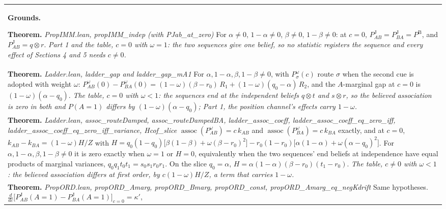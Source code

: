 \documentclass[10pt]{article}
\theoremstyle{definition}
\newcommand{\PB}{P^{\mathrm{B}}}
\newcommand{\PJ}{P^{\mathrm{J}}}
\newcommand{\assoc}{\operatorname{assoc}}
\newlength{\fullw}\setlength{\fullw}{25.9cm}
\begin{document}
{\begin{longtable}{|p{0.9cm}|p{12.2cm}|p{12.2cm}|}
\multicolumn{3}{|p{\fullw}|}{\textbf{Grounds.}\par \textbf{Theorem.} \textit{PropIMM.lean, propIMM\_indep (with PJab\_at\_zero)} \newline For $\alpha\neq0$, $1-\alpha\neq0$, $\beta\neq0$, $1-\beta\neq0$: at $c=0$,
$\PJ_{AB}=\PJ_{BA}=\PB$, and $\PJ_{AB}=q\otimes r$. \newline \textit{Part 1 and the table, $c=0$ with $\omega=1$: the two sequences give one belief, so no statistic registers the sequence and every effect of Sections 4 and 5 needs $c\neq0$.}} \\
\multicolumn{3}{|p{\fullw}|}{\textbf{Theorem.} \textit{Ladder.lean, ladder\_gap and ladder\_gap\_mA1} \newline For $\alpha,1-\alpha,\beta,1-\beta\neq0$, with $P^{\omega}_{\sigma}(c)$ route $\sigma$ when the
second cue is adopted with weight $\omega$:
$P^{\omega}_{AB}(0)-P^{\omega}_{BA}(0)=(1-\omega)(\beta-r_0)\,R_1+(1-\omega)(q_0-\alpha)\,R_2$, and
the $A$-marginal gap at $c=0$ is $(1-\omega)(\alpha-q_0)$. \newline \textit{The table, $c=0$ with $\omega<1$: the sequences end at the independent beliefs $q\otimes t$ and $s\otimes r$, so the believed association is zero in both and $P(A{=}1)$ differs by $(1-\omega)(\alpha-q_0)$; Part 1, the position channel's effects carry $1-\omega$.}} \\
\multicolumn{3}{|p{\fullw}|}{\textbf{Theorem.} \textit{Ladder.lean, assoc\_routeDamped, assoc\_routeDampedBA, ladder\_assoc\_coeff, ladder\_assoc\_coeff\_eq\_zero\_iff, ladder\_assoc\_coeff\_eq\_zero\_iff\_variance, Hcof\_slice} \newline $\assoc(P^{\omega}_{AB})=c\,k_{AB}$ and $\assoc(P^{\omega}_{BA})=c\,k_{BA}$ exactly, and at
$c=0$, $k_{AB}-k_{BA}=(1-\omega)H/Z$ with
$H=q_0(1-q_0)\bigl[\beta(1-\beta)+\omega(\beta-r_0)^2\bigr]-r_0(1-r_0)\bigl[\alpha(1-\alpha)+\omega(\alpha-q_0)^2\bigr]$.
For $\alpha,1-\alpha,\beta,1-\beta\neq0$ it is zero exactly when $\omega=1$ or $H=0$,
equivalently when the two sequences' end beliefs at independence have equal products of
marginal variances, $q_0q_1t_0t_1=s_0s_1r_0r_1$. On the slice $q_0=\alpha$,
$H=\alpha(1-\alpha)(\beta-r_0)(t_1-r_0)$. \newline \textit{The table, $c\neq0$ with $\omega<1$: the believed association differs at first order, by $c(1-\omega)H/Z$, a term that carries $1-\omega$.}} \\
\multicolumn{3}{|p{\fullw}|}{\textbf{Theorem.} \textit{PropORD.lean, propORD\_Amarg, propORD\_Bmarg, propORD\_const, propORD\_Amarg\_eq\_negKdrift} \newline Same hypotheses. $\frac{d}{dc}\bigl[\PJ_{AB}(A{=}1)-\PJ_{BA}(A{=}1)\bigr]_{c=0}=\kappa'$,
}
\end{longtable}}
\end{document}
